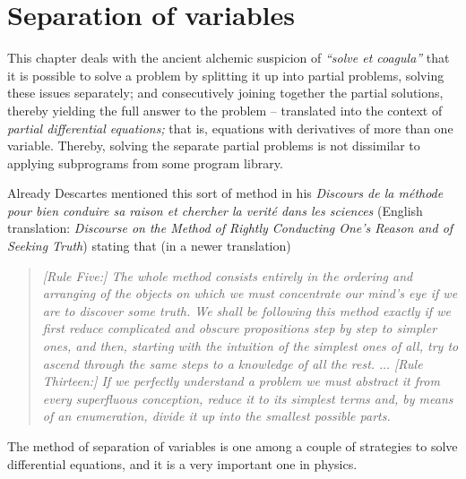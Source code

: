 \chapter{Separation of variables}
\label{2011-m-ch-sv}

This chapter deals with the ancient alchemic suspicion of {\it ``solve et coagula''} that it is possible
to solve a problem by splitting it up into partial problems, solving these issues separately; and
consecutively joining together the partial solutions, thereby yielding the full answer to the problem
-- translated into the context of {\em partial differential equations;}
that is, equations with derivatives of more than one variable.
Thereby, solving the separate partial problems is not dissimilar to
applying subprograms from some program library.

Already Descartes mentioned this sort of method in his
{\it Discours de la m{\'e}thode pour bien conduire sa raison et chercher la verit{\'e} dans les sciences}
(English translation:
{\em Discourse on the Method of Rightly Conducting One's Reason and of Seeking Truth})\cite{Descartes-Discourse}
stating that (in a newer translation\cite{Descartes-CW1})
\begin{quote}
{\em
[Rule Five:]
The whole method consists entirely in the ordering and arranging of the
objects on which we must concentrate our mind's eye if we are to
discover some truth. We shall be following this method exactly if we first
reduce complicated and obscure propositions step by step to simpler
ones, and then, starting with the intuition of the simplest ones of all, try
to ascend through the same steps to a knowledge of all the rest.
$\ldots$
[Rule Thirteen:]
If we perfectly understand a problem we must abstract it from every
superfluous conception, reduce it to its simplest terms and, by means of
an enumeration, divide it up into the smallest possible parts.
}
\end{quote}

The method of
separation of variables
is one among a couple of strategies to solve differential equations,\cite[-20mm]{Evans98,jaenich-an}
and it is a very important one in physics.

